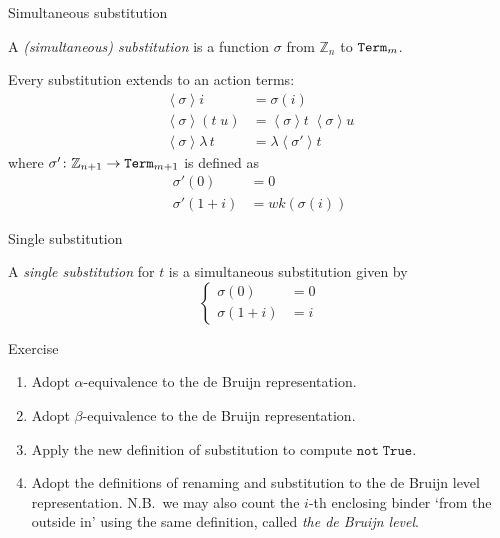 \begin{frame}{Simultaneous substitution}
  \begin{definition}
    A \emph{(simultaneous) substitution} is a function $\sigma$ from $\mathbb{Z}_n$ to $\mathtt{Term}_m$.
  \end{definition}
  Every substitution extends to an action terms: 
  \begin{align*}
    \left< \sigma \right> i                 & = \sigma(i)                                \\
    \left< \sigma \right> \left(t\;u\right) & = \left<\sigma\right>t \; \left<\sigma\right>u \\
    \left< \sigma \right> \lambda\,t        & = \lambda\left< \sigma' \right> t
  \end{align*}
  where $\sigma' \colon \mathbb{Z}_{n+1} \to \mathtt{Term}_{m+1}$ is defined as
  \begin{align*}
    \sigma'(0) & = 0 \\
    \sigma'(1 + i) & = \mathit{wk}\left(\sigma(i)\right)
  \end{align*}
\end{frame}

\begin{frame}{Single substitution}
  \begin{definition}
    A \emph{single substitution} for $t$ is a simultaneous substitution given by
    \[
      \begin{cases}
        \sigma(0) & = 0  \\
        \sigma(1+i) & = i
      \end{cases}
    \]
  \end{definition}
\end{frame}

\begin{frame}{Exercise}
  \begin{enumerate}
    \item Adopt $\alpha$-equivalence to the de Bruijn representation.
    \item Adopt $\beta$-equivalence to the de Bruijn representation.
    \item Apply the new definition of substitution to compute $\mathtt{not}\;\mathtt{True}$.
    \item Adopt the definitions of renaming and substitution to the de Bruijn level representation.
  N.B.\ we may also count the $i$-th enclosing binder `from the outside in' using the same definition, called \emph{the de Bruijn level}.
  \end{enumerate}
\end{frame}

